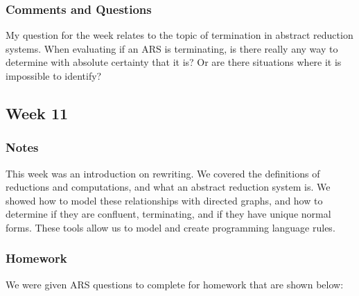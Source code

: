 \documentclass{article}
\theoremstyle{theorem}
\theoremstyle{definition}
\theoremstyle{remark}
\begin{document}
\subsubsection*{Comments and Questions}
My question for the week relates to the topic of termination in abstract reduction systems. When evaluating if an ARS
is terminating, is there really any way to determine with absolute certainty that it is? Or are there situations where
it is impossible to identify?
\subsection{Week 11}
\subsubsection*{Notes}
This week was an introduction on rewriting. We covered the definitions of reductions and computations, and 
what an abstract reduction system is. We showed how to model these relationships with directed graphs, and how
to determine if they are confluent, terminating, and if they have unique normal forms. These tools allow us to 
model and create programming language rules.
\subsubsection*{Homework}
We were given ARS questions to complete for homework that are shown below:
\end{document}
